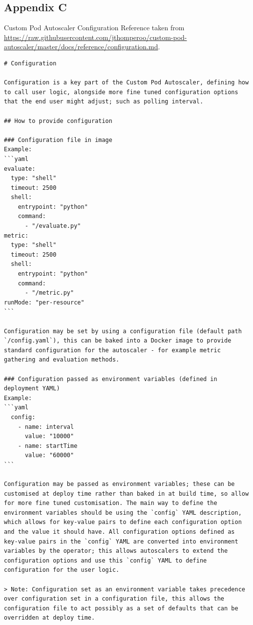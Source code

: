 \subsection{Appendix C}

Custom Pod Autoscaler Configuration Reference taken from
\url{https://raw.githubusercontent.com/jthomperoo/custom-pod-autoscaler/master/docs/reference/configuration.md}.

\begin{lstlisting}
# Configuration

Configuration is a key part of the Custom Pod Autoscaler, defining how to call user logic, alongside more fine tuned configuration options that the end user might adjust; such as polling interval.

## How to provide configuration

### Configuration file in image
Example:  
```yaml
evaluate: 
  type: "shell"
  timeout: 2500
  shell: 
    entrypoint: "python"
    command: 
      - "/evaluate.py"
metric: 
  type: "shell"
  timeout: 2500
  shell: 
    entrypoint: "python"
    command: 
      - "/metric.py"
runMode: "per-resource"
```

Configuration may be set by using a configuration file (default path `/config.yaml`), this can be baked into a Docker image to provide standard configuration for the autoscaler - for example metric gathering and evaluation methods.

### Configuration passed as environment variables (defined in deployment YAML)
Example:  
```yaml
  config: 
    - name: interval
      value: "10000"
    - name: startTime
      value: "60000"
```

Configuration may be passed as environment variables; these can be customised at deploy time rather than baked in at build time, so allow for more fine tuned customisation. The main way to define the environment variables should be using the `config` YAML description, which allows for key-value pairs to define each configuration option and the value it should have. All configuration options defined as key-value pairs in the `config` YAML are converted into environment variables by the operator; this allows autoscalers to extend the configuration options and use this `config` YAML to define configuration for the user logic. 

> Note: Configuration set as an environment variable takes precedence over configuration set in a configuration file, this allows the configuration file to act possibly as a set of defaults that can be overridden at deploy time.


\end{lstlisting}
